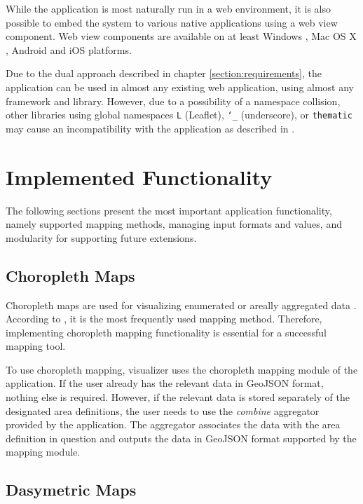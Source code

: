 While the application is most naturally run in a web environment, it is also possible to embed the system to various native applications using a web view component. Web view components are available on at least Windows \citep{small_ten_2012}, Mac OS X \citep{hunter_why_2014}, Android \citep{google_building_2014} and iOS \citep{apple_uiwebview_2014} platforms.

Due to the dual approach described in chapter \ref{section:requirements}, the application can be used in almost any existing web application, using almost any framework and library. However, due to a possibility of a namespace collision, other libraries using global namespaces \texttt{L} (Leaflet), \texttt{\char`_} (underscore), or \texttt{thematic} may cause an incompatibility with the application as described in \citet{osmani_essential_2011}.

\section{Implemented Functionality}

The following sections present the most important application functionality, namely supported mapping methods, managing input formats and values, and modularity for supporting future extensions.

\subsection{Choropleth Maps}

Choropleth maps are used for visualizing enumerated or areally aggregated data \citep[chap.~6]{dent_cartography:_2008}. According to \citet[chap.~14]{slocum_thematic_2014}, it is the most frequently used mapping method. Therefore, implementing choropleth mapping functionality is essential for a successful mapping tool.

To use choropleth mapping, visualizer uses the choropleth mapping module of the application. If the user already has the relevant data in GeoJSON format, nothing else is required. However, if the relevant data is stored separately of the designated area definitions, the user needs to use the \emph{combine} aggregator provided by the application. The aggregator associates the data with the area definition in question and outputs the data in GeoJSON format supported by the mapping module.


\subsection{Dasymetric Maps}

